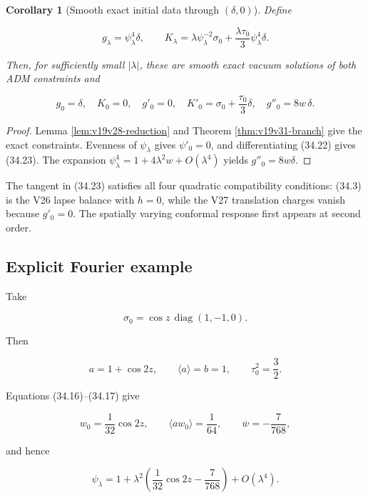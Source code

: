 \documentclass[11pt]{article}
\newtheorem{corollary}[theorem]{Corollary}
\theoremstyle{remark}
\begin{document}
\begin{corollary}[Smooth exact initial data through \((\delta,0)\)]
\label{cor:v19v31-data}
Define

\[
 g_\lambda=\psi_\lambda^4\delta,\qquad
 K_\lambda=\lambda\psi_\lambda^{-2}\sigma_0
 +\frac{\lambda\tau_0}{3}\psi_\lambda^4\delta.                \tag{34.22}
\]

Then, for sufficiently small \(|\lambda|\), these are smooth exact vacuum
solutions of both ADM constraints and

\[
 g_0=\delta,\quad K_0=0,\quad
 g'_0=0,\quad
 K'_0=\sigma_0+\frac{\tau_0}{3}\delta,\quad
 g''_0=8w\,\delta.                                            \tag{34.23}
\]
\end{corollary}

\begin{proof}
Lemma \ref{lem:v19v28-reduction} and Theorem
\ref{thm:v19v31-branch} give the exact constraints.  Evenness of
\(\psi_\lambda\) gives \(\psi'_0=0\), and differentiating (34.22) gives
(34.23).  The expansion
\(\psi_\lambda^4=1+4\lambda^2w+O(\lambda^4)\) yields
\(g''_0=8w\delta\).
\end{proof}

The tangent in (34.23) satisfies all four quadratic compatibility
conditions: (34.3) is the V26 lapse balance with \(h=0\), while the V27
translation charges vanish because \(g'_0=0\).  The spatially varying
conformal response first appears at second order.

\subsection{Explicit Fourier example}

Take

\[
 \sigma_0=\cos z\,\operatorname{diag}(1,-1,0).                \tag{34.24}
\]

Then

\[
 a=1+\cos2z,\qquad \langle a\rangle=b=1,\qquad
 \tau_0^2=\frac32.                                            \tag{34.25}
\]

Equations (34.16)--(34.17) give

\[
 w_0=\frac1{32}\cos2z,\qquad
 \langle aw_0\rangle=\frac1{64},\qquad
 \overline w=-\frac7{768},                                   \tag{34.26}
\]

and hence

\[
 \psi_\lambda
 =1+\lambda^2\left(\frac1{32}\cos2z-\frac7{768}\right)
 +O(\lambda^4).                                               \tag{34.27}
\]
\end{document}
